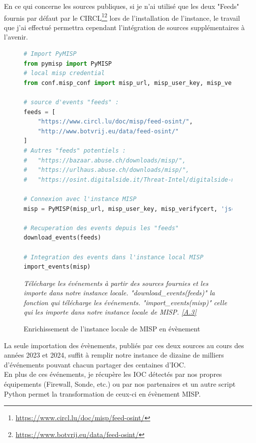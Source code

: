 En ce qui concerne les sources publiques, si je n'ai utilisé que les deux "Feeds" fournis par défaut par le CIRCL\footnote{\url{https://www.circl.lu/doc/misp/feed-osint/}}\footnote{\url{https://www.botvrij.eu/data/feed-osint/}} lors de l'installation de l'instance, le travail que j'ai effectué permettra cependant l'intégration de sources supplémentaires à l'avenir.

\newpage

\begin{figure}[h]%
    \center%
\begin{lstlisting}[language=Python]
# Import PyMISP
from pymisp import PyMISP
# local misp credential
from conf.misp_conf import misp_url, misp_user_key, misp_verifycert

# source d'events "feeds" :
feeds = [
    "https://www.circl.lu/doc/misp/feed-osint/",
    "http://www.botvrij.eu/data/feed-osint/"
]
# Autres "feeds" potentiels :
#   "https://bazaar.abuse.ch/downloads/misp/",
#   "https://urlhaus.abuse.ch/downloads/misp/",
#   "https://osint.digitalside.it/Threat-Intel/digitalside-misp-feed/",

# Connexion avec l'instance MISP
misp = PyMISP(misp_url, misp_user_key, misp_verifycert, 'json')

# Recuperation des events depuis les "feeds"
download_events(feeds)

# Integration des events dans l'instance local MISP
import_events(misp)
\end{lstlisting}
{\small
    \textit{Télécharge les événements à partir des sources fournies et les importe dans notre instance locale. "download\_events(feeds)" la fonction qui télécharge les événements. "import\_events(misp)" celle qui les importe dans notre instance locale de MISP. \hyperref[chap:annexe3]{[A.3]}}
    }
    \caption[Enrichissement de l’instance locale de MISP en évènement]{Enrichissement de l’instance locale de MISP en évènement}\label{fig:GetEventsMISP}
\end{figure}

\vspace{1em}

La seule importation des évènements, publiés par ces deux sources au cours des années 2023 et 2024, suffit à remplir notre instance de dizaine de milliers d'événements pouvant chacun partager des centaines d'IOC.\\

En plus de ces événements, je récupère les IOC détectés par nos propres équipements (Firewall, Sonde, etc.) ou par nos partenaires et un autre script Python permet la transformation de ceux-ci en évènement MISP.\\


